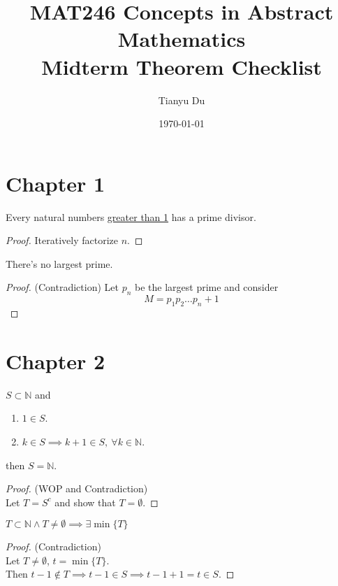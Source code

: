 \documentclass{article}
\author{Tianyu Du}
\date{\today}
\title{MAT246 Concepts in Abstract Mathematics \\ \small Midterm Theorem Checklist}
\begin{document}
	\maketitle
	\section{Chapter 1}
	\begin{lemma}[1.1.1]
		Every natural numbers \ul{greater than 1} has a prime divisor.
		\begin{proof}
			Iteratively factorize $n$.
		\end{proof}
	\end{lemma}
	
	\begin{theorem}[1.1.2]
		There's no largest prime.
		\begin{proof}
			(Contradiction) Let $p_n$ be the largest prime and consider \[M=p_1 p_2 \dots p_n + 1\]
		\end{proof}
	\end{theorem}
	
	\section{Chapter 2}
	\begin{theorem}[2.1.1 PMI] $S \subset \mathbb{N}$ and 
	\begin{enumerate}
		\item $1 \in S$.
		\item $k \in S \implies k+1 \in S,\ \forall k \in \mathbb{N}$.
	\end{enumerate}
	then $S = \mathbb{N}$.
		\begin{proof}
			(WOP and Contradiction) \\
			Let $T = S^c$ and show that $T = \emptyset$.
		\end{proof}
	\end{theorem}
	
	\begin{theorem}[2.1.2 WOP]
		$T \subset \mathbb{N} \land T \neq \emptyset \implies \exists \min\{T\}$
		\begin{proof}
			(Contradiction) \\
			Let $T \neq \emptyset$, $t = \min\{T\}$. \\
			Then $t-1 \notin T \implies t-1 \in S \implies t-1+1 = t \in S$.
		\end{proof}
	\end{theorem}
	
	\begin{theorem}
		
	\end{theorem}
	
\end{document}
